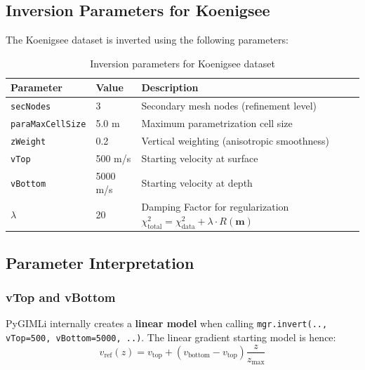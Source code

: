 \subsection*{Inversion Parameters for Koenigsee}

The Koenigsee dataset is inverted using the following parameters:

\begin{table}[H]
\centering
\caption{Inversion parameters for Koenigsee dataset}
\label{tab:inversion_params}
\begin{tabular}{|l|l|l|}
\hline
\textbf{Parameter} & \textbf{Value} & \textbf{Description} \\
\hline
\texttt{secNodes} & 3 & Secondary mesh nodes (refinement level) \\
\texttt{paraMaxCellSize} & 5.0 m & Maximum parametrization cell size \\
\texttt{zWeight} & 0.2 & Vertical weighting (anisotropic smoothness) \\
\texttt{vTop} & 500 m/s & Starting velocity at surface \\
\texttt{vBottom} & 5000 m/s & Starting velocity at depth \\
$\lambda$ & 20 & Damping Factor for regularization $\chi^2_{\text{total}} = \chi^2_{\text{data}} + \lambda \cdot R(\mathbf{m})$ \\
\hline
\end{tabular}
\end{table}

\subsection*{Parameter Interpretation}

\subsubsection*{vTop and vBottom}

PyGIMLi internally creates a \textbf{linear model} when calling \texttt{mgr.invert(.., vTop=500, vBottom=5000, ..)}. The linear gradient starting model is hence:
\begin{equation}
v_{\text{ref}}(z) = v_{\text{top}} + (v_{\text{bottom}} - v_{\text{top}}) \frac{z}{z_{\text{max}}}
\end{equation}

